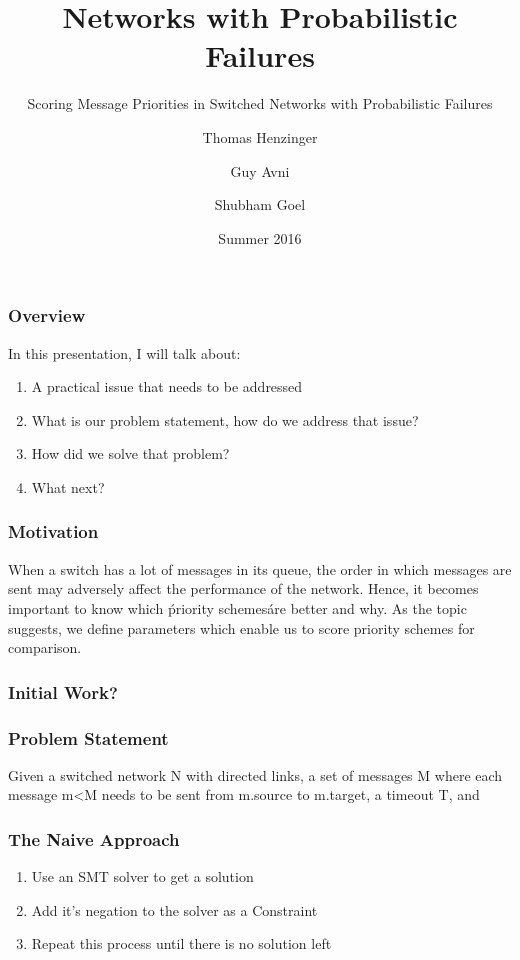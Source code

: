 \documentclass{beamer}
\begin{document}
\title[Probabilistic Networks]{Networks with Probabilistic Failures}
\subtitle[Probabilistically Scoring Message Priorities]{Scoring Message Priorities in Switched Networks with Probabilistic Failures}
\author[Shubham]{Thomas Henzinger  \and Guy Avni  \and Shubham Goel }
\date[Summer 2016]{Summer 2016}

\begin{frame}[plain]
  \titlepage
\end{frame}

\begin{frame}
\frametitle{Overview}
In this presentation, I will talk about:
\begin{enumerate}
\item A practical issue that needs to be addressed
\item What is our problem statement, how do we address that issue?
\item How did we solve that problem?
\item What next?
\end{enumerate}
\end{frame}

\begin{frame}
\frametitle{Motivation}
When a switch has a lot of messages in its queue, the order in which messages are sent may adversely affect the performance of the network. Hence, it becomes important to know which \'priority schemes\' are better and why. As the topic suggests, we define parameters which enable us to score priority schemes for comparison.
\end{frame}

\begin{frame}
\frametitle{Initial Work?}
\end{frame}

\begin{frame}
\frametitle{Problem Statement}
Given a switched network N with directed links, a set of messages M where each message m<M needs to be sent from m.source to m.target, a timeout T, and 
\end{frame}

\begin{frame}
\frametitle{The Naive Approach}
\begin{enumerate}
\item Use an SMT solver to get a solution
\item Add it's negation to the solver as a Constraint
\item Repeat this process until there is no solution left
\end{enumerate}
\end{frame}
\end{document}
